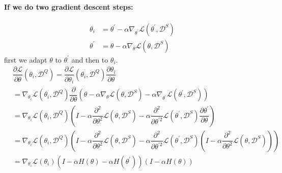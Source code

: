 \documentclass{article}
\begin{document}
\paragraph{If we do two gradient descent steps:}
	\begin{align}
		\theta_i &= \theta^{'} - \alpha \nabla_{\theta^{'}}\mathcal{L}(\theta^{'},\mathcal{D}^{S}) \\
		\theta^{'} &= \theta - \alpha \nabla_{\theta} \mathcal{L} (\theta, \mathcal{D}^{S})
	\end{align}
	first we adapt $\theta$ to $\theta^{'}$ and then to $\theta_i$.
	\begin{align*}
		&\dfrac{\partial \mathcal{L}}{\partial \theta}(\theta_i, \mathcal{D}^{Q}) = \dfrac{\partial \mathcal{L}}{\partial \theta_i}(\theta_i, \mathcal{D}^{Q}) \dfrac{\partial \theta_i}{\partial \theta} \\
		&= \nabla_{\theta_i} \mathcal{L}(\theta_i, \mathcal{D}^{Q}) \dfrac{\partial}{\partial \theta}(\theta - \alpha \nabla_{\theta} \mathcal{L}(\theta, \mathcal{D}^{S}) - \alpha \nabla_{\theta^{'}}\mathcal{L}(\theta^{'},\mathcal{D}^{S})) \\
		&= \nabla_{\theta_i} \mathcal{L}(\theta_i, \mathcal{D}^{Q}) \left(I - \alpha \dfrac{\partial^2}{\partial \theta^2} \mathcal{L}(\theta, \mathcal{D}^{S}) - \alpha \dfrac{\partial^2}{\partial \theta^{'2}}\mathcal{L}(\theta^{'},\mathcal{D}^{S}) \dfrac{\partial \theta^{'}}{\partial \theta}  \right) \\
		&= \nabla_{\theta_i} \mathcal{L}(\theta_i, \mathcal{D}^{Q}) \left(I - \alpha \dfrac{\partial^2}{\partial \theta^2} \mathcal{L}(\theta, \mathcal{D}^{S}) - \alpha \dfrac{\partial^2}{\partial \theta^{'2}}\mathcal{L}(\theta^{'},\mathcal{D}^{S}) (I - \alpha \dfrac{\partial^2}{\partial \theta^2} \mathcal{L}(\theta, \mathcal{D}^{S}))  \right) \\
		&= \nabla_{\theta_i} \mathcal{L}(\theta_i) \left(I - \alpha H(\theta) - \alpha H(\theta^{'}) \right) \left( I - \alpha H(\theta) \right) \\
	\end{align*}
\end{document}
